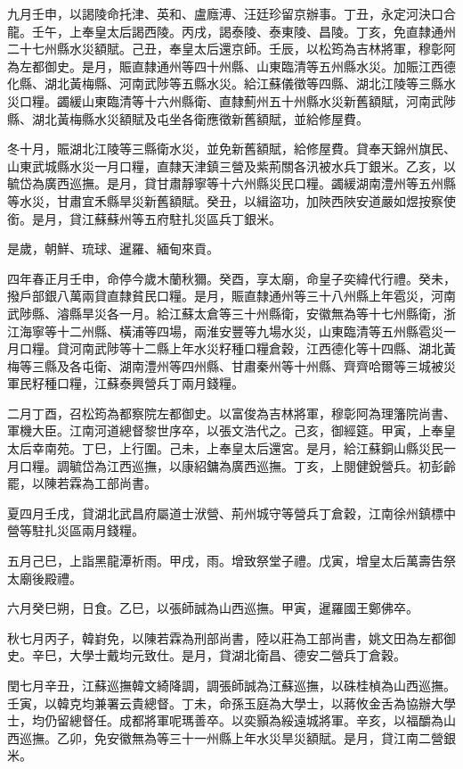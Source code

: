\begin{pinyinscope}
九月壬申，以謁陵命托津、英和、盧廕溥、汪廷珍留京辦事。丁丑，永定河決口合龍。壬午，上奉皇太后謁西陵。丙戌，謁泰陵、泰東陵、昌陵。丁亥，免直隸通州二十七州縣水災額賦。己丑，奉皇太后還京師。壬辰，以松筠為吉林將軍，穆彰阿為左都御史。是月，賑直隸通州等四十州縣、山東臨清等五州縣水災。加賑江西德化縣、湖北黃梅縣、河南武陟等五縣水災。給江蘇儀徵等四縣、湖北江陵等三縣水災口糧。蠲緩山東臨清等十六州縣衛、直隸薊州五十州縣水災新舊額賦，河南武陟縣、湖北黃梅縣水災額賦及屯坐各衛應徵新舊額賦，並給修屋費。

冬十月，賑湖北江陵等三縣衛水災，並免新舊額賦，給修屋費。貸奉天錦州旗民、山東武城縣水災一月口糧，直隸天津鎮三營及紫荊關各汛被水兵丁銀米。乙亥，以毓岱為廣西巡撫。是月，貸甘肅靜寧等十六州縣災民口糧。蠲緩湖南澧州等五州縣等水災，甘肅宜禾縣旱災新舊額賦。癸丑，以緝盜功，加陜西陜安道嚴如煜按察使銜。是月，貸江蘇蘇州等五府駐扎災區兵丁銀米。

是歲，朝鮮、琉球、暹羅、緬甸來貢。

四年春正月壬申，命停今歲木蘭秋獮。癸酉，享太廟，命皇子奕緯代行禮。癸未，撥戶部銀八萬兩貸直隸貧民口糧。是月，賑直隸通州等三十八州縣上年雹災，河南武陟縣、濬縣旱災各一月。給江蘇太倉等三十州縣衛，安徽無為等十七州縣衛，浙江海寧等十二州縣、橫浦等四場，兩淮安豐等九場水災，山東臨清等五州縣雹災一月口糧。貸河南武陟等十二縣上年水災籽種口糧倉穀，江西德化等十四縣、湖北黃梅等三縣及各屯衛、湖南澧州等四州縣、甘肅秦州等十州縣、齊齊哈爾等三城被災軍民籽種口糧，江蘇泰興營兵丁兩月錢糧。

二月丁酉，召松筠為都察院左都御史。以富俊為吉林將軍，穆彰阿為理籓院尚書、軍機大臣。江南河道總督黎世序卒，以張文浩代之。己亥，御經筵。甲寅，上奉皇太后幸南苑。丁巳，上行圍。己未，上奉皇太后還宮。是月，給江蘇銅山縣災民一月口糧。調毓岱為江西巡撫，以康紹鏞為廣西巡撫。丁亥，上閱健銳營兵。初彭齡罷，以陳若霖為工部尚書。

夏四月壬戌，貸湖北武昌府屬道士洑營、荊州城守等營兵丁倉穀，江南徐州鎮標中營等駐扎災區兩月錢糧。

五月己巳，上詣黑龍潭祈雨。甲戌，雨。增致祭堂子禮。戊寅，增皇太后萬壽告祭太廟後殿禮。

六月癸巳朔，日食。乙巳，以張師誠為山西巡撫。甲寅，暹羅國王鄭佛卒。

秋七月丙子，韓崶免，以陳若霖為刑部尚書，陸以莊為工部尚書，姚文田為左都御史。辛巳，大學士戴均元致仕。是月，貸湖北衛昌、德安二營兵丁倉穀。

閏七月辛丑，江蘇巡撫韓文綺降調，調張師誠為江蘇巡撫，以硃桂楨為山西巡撫。壬寅，以韓克均兼署云貴總督。丁未，命孫玉庭為大學士，以蔣攸金舌為協辦大學士，均仍留總督任。成都將軍呢瑪善卒。以奕顥為綏遠城將軍。辛亥，以福釂為山西巡撫。乙卯，免安徽無為等三十一州縣上年水災旱災額賦。是月，貸江南二營銀米。


\end{pinyinscope}
